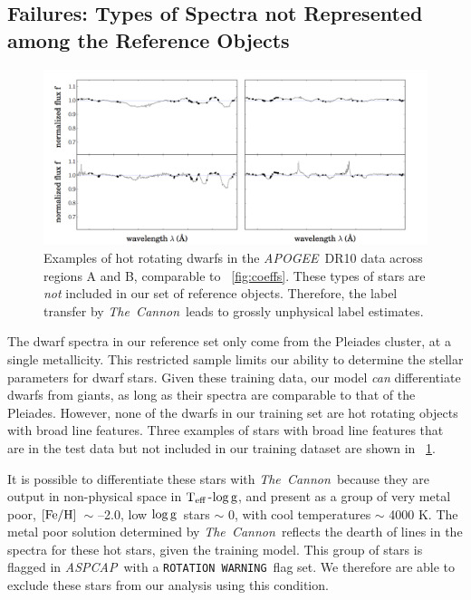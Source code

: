 \documentclass[12pt, preprint]{aastex}
\newcommand{\teff}{\mbox{$\rm T_{eff}$}}
\newcommand{\feh}{\mbox{$\rm [Fe/H]$}}
\newcommand{\logg}{\mbox{$\rm \log g$}}
\newcommand{\tc}{\textsl{The~Cannon}}
\newcommand{\apogee}{\textsl{APOGEE}}
\newcommand{\aspcap}{\textsl{ASPCAP}}
\newcommand{\rotwarn}{\texttt{ROTATION WARNING}}
\begin{document}
\subsection{Failures: Types of Spectra not Represented among the Reference Objects}
\label{sec:AnomalousSpectra}

  \begin{figure}[!h]
   \centering
 \includegraphics[width=\hsize]{./plots/2dwarfs.png}
  \caption{Examples of hot rotating dwarfs in the \apogee\ DR10 data across regions A and B, comparable to \figurename~\ref{fig:coeffs}. These types of stars are \textit{not} included in our set of reference objects. Therefore, the label transfer by \tc\ leads to grossly unphysical label estimates.}
\label{fig:dwarfs}
\end{figure}


The dwarf spectra in our reference set only come from the Pleiades cluster, at a single metallicity. 
This restricted sample limits our ability to determine the stellar parameters for dwarf stars. 
Given these training data, our model \textit{can} differentiate dwarfs from giants, as long as their spectra are comparable to that of the Pleiades. 
However, none of the dwarfs in our training set are hot rotating objects with broad line features. 
Three examples of stars with broad line features that are in the test data but not included in our training dataset are shown in \figurename~\ref{fig:dwarfs}.

It is possible to differentiate these stars with \tc\ because they are output in non-physical space in \teff-\logg, and present as a group of very metal poor, \feh\ $\sim$ --2.0, low \logg\ stars $\sim$ 0, with cool temperatures $\sim$ 4000 K. The metal poor solution determined by \tc\ reflects the dearth of lines in the spectra for these hot stars, given the training model. This group of stars is flagged in \aspcap\ with a \rotwarn\ flag set. We therefore are able to exclude these stars from our analysis using this condition. 
 
\end{document}

